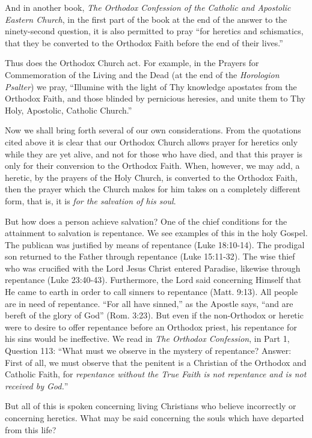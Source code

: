 And in another book, \textit{The Orthodox Confession of the Catholic and Apostolic Eastern Church}, in the first part of the book at the end of the answer to the ninety-second question, it is also permitted to pray ``for heretics and schismatics, that they be converted to the Orthodox Faith before the end of their lives.''

Thus does the Orthodox Church act. For example, in the Prayers for Commemoration of the Living and the Dead (at the end of the \textit{Horologion Psalter}) we pray, ``Illumine with the light of Thy knowledge apostates from the Orthodox Faith, and those blinded by pernicious heresies, and unite them to Thy Holy, Apostolic, Catholic Church.''

Now we shall bring forth several of our own considerations. From the quotations cited above it is clear that our Orthodox Church allows prayer for heretics only while they are yet alive, and not for those who have died, and that this prayer is only for their conversion to the Orthodox Faith. When, however, we may add, a heretic, by the prayers of the Holy Church, is converted to the Orthodox Faith, then the prayer which the Church makes for him takes on a completely different form, that is, it is \textit{for the salvation of his soul}.

But how does a person achieve salvation? One of the chief conditions for the attainment to salvation is repentance. We see examples of this in the holy Gospel. The publican was justified by means of repentance (Luke 18:10-14). The prodigal son returned to the Father through repentance (Luke 15:11-32). The wise thief who was crucified with the Lord Jesus Christ entered Paradise, likewise through repentance (Luke 23:40-43). Furthermore, the Lord said concerning Himself that He came to earth in order to call sinners to repentance (Matt. 9:13). All people are in need of repentance. ``For all have sinned,'' as the Apostle says, ``and are bereft of the glory of God'' (Rom. 3:23). But even if the non-Orthodox or heretic were to desire to offer repentance before an Orthodox priest, his repentance for his sins would be ineffective. We read in \textit{The Orthodox Confession}, in Part 1, Question 113: ``What must we observe in the mystery of repentance? Answer: First of all, we must observe that the penitent is a Christian of the Orthodox and Catholic Faith, for \textit{repentance without the True Faith is not repentance and is not received by God.}''

But all of this is spoken concerning living Christians who believe incorrectly or concerning heretics. What may be said concerning the souls which have departed from this life?

